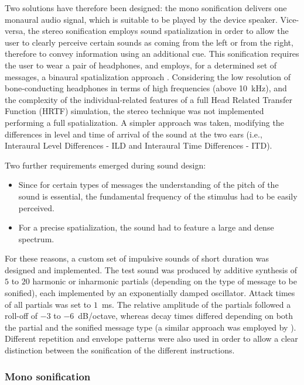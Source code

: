 \documentclass{article}
\begin{document}
Two solutions have therefore been designed: the mono sonification delivers one monaural audio signal, which is suitable to be played by the device speaker. Vice-versa, the stereo sonification employs sound spatialization in order to allow the user to clearly perceive certain sounds as coming from the left or from the right, therefore to convey information using an additional cue. This sonification requires the user to wear a pair of headphones, and employs, for a determined set of messages, a binaural spatialization approach \cite{HammershoiMoller2002}.
Considering the low resolution of bone-conducting headphones in terms of high frequencies (above 10~kHz), and the complexity of the individual-related features of a full Head Related Transfer Function (HRTF) simulation, the stereo technique was not implemented performing a full spatialization. A simpler approach was taken, modifying the differences in level and time of arrival of the sound at the two ears (i.e., Interaural Level Differences - ILD and Interaural Time Differences - ITD).

Two further requirements emerged during sound design:
\begin{itemize}
\item Since for certain types of messages the understanding of the pitch of the sound is essential, the fundamental frequency of the stimulus had to be easily perceived.
\item For a precise spatialization, the sound had to feature a large and dense spectrum.
\end{itemize}

For these reasons, a custom set of impulsive sounds of short duration was designed and implemented.
The test sound was produced by additive synthesis of $5$ to $20$ harmonic or inharmonic partials (depending on the type of message to be sonified), each implemented by an exponentially damped oscillator. Attack times of all partials was set to $1$~ms. The relative amplitude of the partials followed a roll-off of $-3$ to $-6$~dB/octave, whereas decay times differed depending on both the partial and the sonified message type (a similar approach was employed by \cite{KatzRio2008}).
Different repetition and envelope patterns were also used in order to allow a clear distinction between the sonification of the different instructions.

\subsubsection{Mono sonification}
\label{sub:mono}
\end{document}
